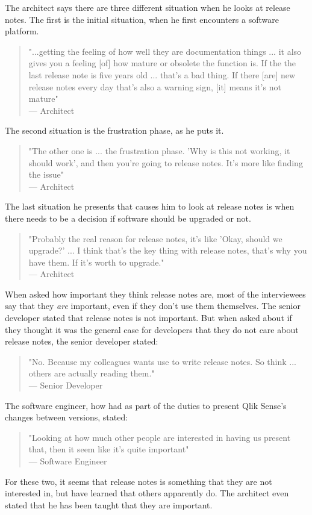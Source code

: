 \documentclass{article}
\begin{document}
The architect says there are three different situation when he looks at release notes. The first is the initial situation, when he first encounters a software platform.
\begin{quote}
"...getting the feeling of how well they are documentation things ... it also gives you a feeling [of] how mature or obsolete the function is. If the the last release note is five years old ... that's a bad thing. If there [are] new release notes every day that's also a warning sign, [it] means it's not mature" \\
--- Architect
\end{quote}
The second situation is the frustration phase, as he puts it.
\begin{quote}
"The other one is ... the frustration phase. 'Why is this not working, it should work', and then you're going to release notes. It's more like finding the issue"\\
--- Architect
\end{quote}
The last situation he presents that causes him to look at release notes is when there needs to be a decision if software should be upgraded or not.
\begin{quote}
"Probably the real reason for release notes, it's like 'Okay, should we upgrade?' ... I think that's the key thing with release notes, that's why you have them. If it's worth to upgrade." \\
--- Architect
\end{quote}
When asked how important they think release notes are, most of the interviewees say that they \textit{are} important, even if they don't use them themselves. The senior developer stated that release notes is not important. But when asked about if they thought it was the general case for developers that they do not care about release notes, the senior developer stated:
\begin{quote}
"No. Because my colleagues wants use to write release notes. So think ... others are actually reading them."\\ --- Senior Developer
\end{quote}
The software engineer, how had as part of the duties to present Qlik Sense's changes between versions, stated:
\begin{quote}
"Looking at how much other people are interested in having us present that, then it seem like it's quite important" \\
--- Software Engineer
\end{quote}
For these two, it seems that release notes is something that they are not interested in, but have learned that others apparently do. The architect even stated that he has been taught that they are important.
\end{document}
